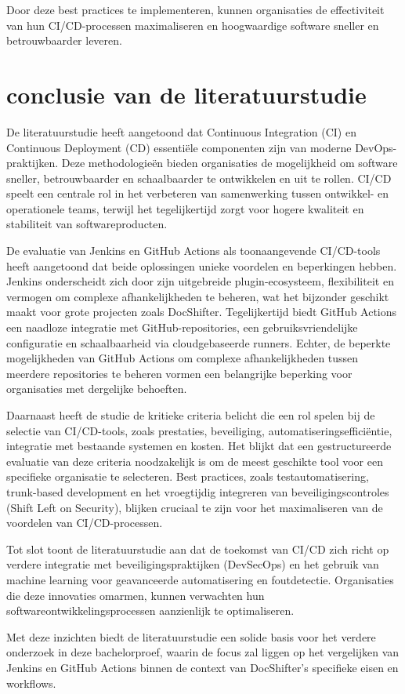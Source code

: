 Door deze best practices te implementeren, kunnen organisaties de effectiviteit van hun CI/CD-processen maximaliseren en hoogwaardige software sneller en betrouwbaarder leveren.


\section{conclusie van de literatuurstudie}


De literatuurstudie heeft aangetoond dat Continuous Integration (CI) en Continuous Deployment (CD) essentiële componenten zijn van moderne DevOps-praktijken. Deze methodologieën bieden organisaties de mogelijkheid om software sneller, betrouwbaarder en schaalbaarder te ontwikkelen en uit te rollen. CI/CD speelt een centrale rol in het verbeteren van samenwerking tussen ontwikkel- en operationele teams, terwijl het tegelijkertijd zorgt voor hogere kwaliteit en stabiliteit van softwareproducten.

De evaluatie van Jenkins en GitHub Actions als toonaangevende CI/CD-tools heeft aangetoond dat beide oplossingen unieke voordelen en beperkingen hebben. Jenkins onderscheidt zich door zijn uitgebreide plugin-ecosysteem, flexibiliteit en vermogen om complexe afhankelijkheden te beheren, wat het bijzonder geschikt maakt voor grote projecten zoals DocShifter. Tegelijkertijd biedt GitHub Actions een naadloze integratie met GitHub-repositories, een gebruiksvriendelijke configuratie en schaalbaarheid via cloudgebaseerde runners. Echter, de beperkte mogelijkheden van GitHub Actions om complexe afhankelijkheden tussen meerdere repositories te beheren vormen een belangrijke beperking voor organisaties met dergelijke behoeften.

Daarnaast heeft de studie de kritieke criteria belicht die een rol spelen bij de selectie van CI/CD-tools, zoals prestaties, beveiliging, automatiseringsefficiëntie, integratie met bestaande systemen en kosten. Het blijkt dat een gestructureerde evaluatie van deze criteria noodzakelijk is om de meest geschikte tool voor een specifieke organisatie te selecteren. Best practices, zoals testautomatisering, trunk-based development en het vroegtijdig integreren van beveiligingscontroles (Shift Left on Security), blijken cruciaal te zijn voor het maximaliseren van de voordelen van CI/CD-processen.

Tot slot toont de literatuurstudie aan dat de toekomst van CI/CD zich richt op verdere integratie met beveiligingspraktijken (DevSecOps) en het gebruik van machine learning voor geavanceerde automatisering en foutdetectie. Organisaties die deze innovaties omarmen, kunnen verwachten hun softwareontwikkelingsprocessen aanzienlijk te optimaliseren.

Met deze inzichten biedt de literatuurstudie een solide basis voor het verdere onderzoek in deze bachelorproef, waarin de focus zal liggen op het vergelijken van Jenkins en GitHub Actions binnen de context van DocShifter's specifieke eisen en workflows.


